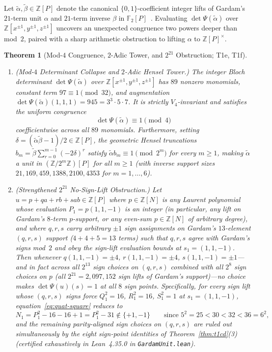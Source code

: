 \documentclass[11pt,reqno]{amsart}
\newtheorem{theorem}{Theorem}[section]
\theoremstyle{definition}
\newcommand{\Z}{\mathbb{Z}}
\newcommand{\F}{\mathbb{F}}
\begin{document}
Let $\widetilde{\alpha}, \widetilde{\beta} \in \Z[P]$ denote the canonical $\{0,1\}$-coefficient
integer lifts of Gardam's $21$-term unit $\alpha$ and $21$-term inverse $\beta$ in
$\F_2[P]$~\cite{gardam2021counterexample}. Evaluating $\det\Psi(\widetilde{\alpha})$ over
$\Z[x^{\pm 1}, y^{\pm 1}, z^{\pm 1}]$ uncovers an unexpected congruence two powers deeper than
mod~$2$, paired with a sharp arithmetic obstruction to lifting $\alpha$ to $\Z[P]^\times$.

\begin{theorem}[Mod-$4$ Congruence, $2$-Adic Tower, and $2^{21}$ Obstruction; \textsf{T1e}, \textsf{T1f}]
\label{thm:t1ef}
\leavevmode
\begin{enumerate}[leftmargin=2em]
  \item \emph{(Mod-$4$ Determinant Collapse and $2$-Adic Hensel Tower.)}
    The integer Bloch determinant $\det\Psi(\widetilde{\alpha})$ over $\Z[x^{\pm 1}, y^{\pm 1}, z^{\pm 1}]$
    has $89$ nonzero monomials, constant term $97 \equiv 1 \pmod{32}$, and augmentation
    $\det\Psi(\widetilde{\alpha})(1,1,1) = 945 = 3^3 \cdot 5 \cdot 7$. It is strictly
    $V_4$-invariant and satisfies the uniform congruence
    \[
      \det\Psi(\widetilde{\alpha}) \equiv 1 \pmod{4}
    \]
    coefficientwise across all $89$ monomials. Furthermore, setting $\delta = (\widetilde{\alpha}\widetilde{\beta} - 1)/2 \in \Z[P]$,
    the geometric Hensel truncations $b_m = \widetilde{\beta}\sum_{r=0}^{m-1}(-2\delta)^r$ satisfy
    $\widetilde{\alpha} b_m \equiv 1 \pmod{2^m}$ for every $m \ge 1$, making $\widetilde{\alpha}$ a
    unit in $(\Z/2^m\Z)[P]$ for all $m \ge 1$ (with inverse support sizes $21, 169, 459, 1388, 2100, 4353$
    for $m = 1, \dots, 6$).
  \item \emph{(Strengthened $2^{21}$ No-Sign-Lift Obstruction.)}
    Let $u = p + qa + rb + sab \in \Z[P]$ where $p \in \Z[N]$ is \emph{any} Laurent polynomial
    whose evaluation $P_1 = p(1,1,-1)$ is an integer (in particular, any lift on Gardam's $8$-term
    $p$-support, or any even-sum $p \in \Z[N]$ of arbitrary degree), and where $q, r, s$ carry
    \emph{arbitrary} $\pm 1$ sign assignments on Gardam's $13$-element $(q,r,s)$ support
    ($4+4+5 = 13$ terms) such that $q,r,s$ agree with Gardam's signs mod~$2$ and obey the sign-lift
    evaluation bounds at $s_1 = (1,1,-1)$. Then whenever $q(1,1,-1) = \pm 4$, $r(1,1,-1) = \pm 4$,
    $s(1,1,-1) = \pm 1$---and in fact across \emph{all} $2^{13}$ sign choices on $(q,r,s)$
    combined with \emph{all} $2^8$ sign choices on $p$ (all $2^{21} = 2{,}097{,}152$ sign lifts of
    Gardam's support)---no choice makes $\det\Psi(u)(s) = 1$ at all $8$ sign points. Specifically,
    for every sign lift whose $(q,r,s)$ signs force $Q_1^2 = 16$, $R_1^2 = 16$, $S_1^2 = 1$ at
    $s_1 = (1,1,-1)$, equation~\eqref{eq:quat-square} reduces to
    \[
      N_1 = P_1^2 - 16 - 16 + 1 = P_1^2 - 31 \notin \{+1, -1\}
      \qquad\text{since } 5^2 = 25 < 30 < 32 < 36 = 6^2,
    \]
    and the remaining parity-aligned sign choices on $(q,r,s)$ are ruled out simultaneously by the
    eight sign-point identities of Theorem~\ref{thm:t1cd}(3) (certified exhaustively in Lean~4.35.0
    in \texttt{GardamUnit.lean}).
\end{enumerate}
\end{theorem}
\end{document}
